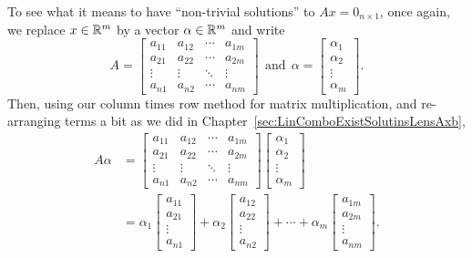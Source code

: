 To see what it means to have ``non-trivial solutions'' to $Ax=0_{n \times 1}$, once again, we replace $x \in \mathbb R^m$ by a vector $\alpha \in \mathbb R^m$ and write
 \begin{equation}
\label{eq:MatrixFromLinearIndependence_proTipB}    
A=\left[\begin{array}{cccc} a_{11}& a_{12}& \cdots & a_{1m} \\
 a_{21}& a_{22}& \cdots & a_{2m}  \\
 \vdots & \vdots&  \ddots & \vdots \\
 a_{n1}& a_{n2}& \cdots & a_{nm} 
 \end{array}\right]~~\text{and}~~\alpha =\left[ \begin{array}{c} \alpha_1 \\ \alpha_2 \\
\vdots \\ \alpha_m   \end{array} \right]. 
 \end{equation}
Then, using our column times row method for matrix multiplication, and re-arranging terms a bit as we did in Chapter~\ref{sec:LinComboExistSolutinsLensAxb},
\begin{equation}
    \label{eq:LinearIndepColumnsA01}
    \begin{aligned}
A \alpha &= \left[\begin{array}{cccc} a_{11}& a_{12}& \cdots & a_{1m} \\
 a_{21}& a_{22}& \cdots & a_{2m}  \\
 \vdots & \vdots&  \ddots & \vdots \\
 a_{n1}& a_{n2}& \cdots & a_{nm} 
 \end{array}\right] \left[ \begin{array}{c} \alpha_1 \\ \alpha_2\\
\vdots \\ \alpha_m  \end{array} \right] \\
& = \alpha_1 \begin{bmatrix} a_{11} \\ a_{21}\\ \vdots \\ a_{n1} \end{bmatrix}  + \alpha_2  \begin{bmatrix} a_{12} \\ a_{22}\\ \vdots \\ a_{n2} \end{bmatrix}  + \cdots + \alpha_m \begin{bmatrix} a_{1m} \\ a_{2m}\\ \vdots \\ a_{nm} \end{bmatrix}.
    \end{aligned}
\end{equation}
